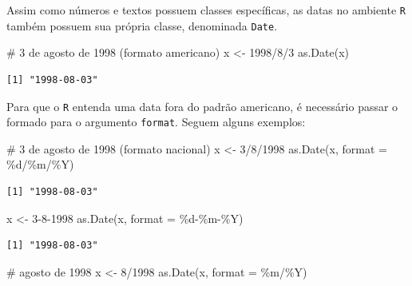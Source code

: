 \documentclass[
  letterpaper,
  DIV=11,
  numbers=noendperiod]{scrreprt}
\newenvironment{Shaded}{\begin{snugshade}}{\end{snugshade}}
\newcommand{\AttributeTok}[1]{\textcolor[rgb]{0.40,0.45,0.13}{#1}}
\newcommand{\CommentTok}[1]{\textcolor[rgb]{0.37,0.37,0.37}{#1}}
\newcommand{\FunctionTok}[1]{\textcolor[rgb]{0.28,0.35,0.67}{#1}}
\newcommand{\NormalTok}[1]{\textcolor[rgb]{0.00,0.23,0.31}{#1}}
\newcommand{\OtherTok}[1]{\textcolor[rgb]{0.00,0.23,0.31}{#1}}
\newcommand{\StringTok}[1]{\textcolor[rgb]{0.13,0.47,0.30}{#1}}
\theoremstyle{definition}
\theoremstyle{plain}
\theoremstyle{definition}
\theoremstyle{plain}
\theoremstyle{remark}
\begin{document}
Assim como números e textos possuem classes específicas, as datas no
ambiente \texttt{R} também possuem sua própria classe, denominada
\texttt{Date}.

\begin{Shaded}
\begin{Highlighting}[]
\CommentTok{\# 3 de agosto de 1998 (formato americano)}
\NormalTok{x }\OtherTok{\textless{}{-}} \StringTok{\textquotesingle{}1998/8/3\textquotesingle{}}
\FunctionTok{as.Date}\NormalTok{(x)}
\end{Highlighting}
\end{Shaded}

\begin{verbatim}
[1] "1998-08-03"
\end{verbatim}

Para que o \texttt{R} entenda uma data fora do padrão americano, é
necessário passar o formado para o argumento \texttt{format}. Seguem
alguns exemplos:

\begin{Shaded}
\begin{Highlighting}[]
\CommentTok{\# 3 de agosto de 1998 (formato nacional)}
\NormalTok{x }\OtherTok{\textless{}{-}} \StringTok{\textquotesingle{}3/8/1998\textquotesingle{}}
\FunctionTok{as.Date}\NormalTok{(x, }\AttributeTok{format =} \StringTok{\textquotesingle{}\%d/\%m/\%Y\textquotesingle{}}\NormalTok{)}
\end{Highlighting}
\end{Shaded}

\begin{verbatim}
[1] "1998-08-03"
\end{verbatim}

\begin{Shaded}
\begin{Highlighting}[]
\NormalTok{x }\OtherTok{\textless{}{-}} \StringTok{\textquotesingle{}3{-}8{-}1998\textquotesingle{}}
\FunctionTok{as.Date}\NormalTok{(x, }\AttributeTok{format =} \StringTok{\textquotesingle{}\%d{-}\%m{-}\%Y\textquotesingle{}}\NormalTok{)}
\end{Highlighting}
\end{Shaded}

\begin{verbatim}
[1] "1998-08-03"
\end{verbatim}

\begin{Shaded}
\begin{Highlighting}[]
\CommentTok{\# agosto de 1998}
\NormalTok{x }\OtherTok{\textless{}{-}} \StringTok{\textquotesingle{}8/1998\textquotesingle{}}
\FunctionTok{as.Date}\NormalTok{(x, }\AttributeTok{format =} \StringTok{\textquotesingle{}\%m/\%Y\textquotesingle{}}\NormalTok{)}
\end{Highlighting}
\end{Shaded}
\end{document}
